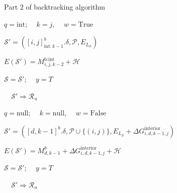 \documentclass[11pt,letterpaper]{article}  \usepackage[margin=1in]{geometry}
\theoremstyle{definition}  \newtheorem{Definition}[theorem]{Definition}
\begin{document}
\begin{algorithm}
	\caption*{Part 2 of backtracking algorithm}
	\begin{algorithmic}[1]
		\footnotesize
		
		 
		
		\State $q = \text{int}$; \ \ $k = j$, \ \ $w= \mathrm{True}$
		\EndIf	
		
		
		\State$\mathcal{S}' = ([i,j]^b_{\text{int}:k-1}.\delta, \mathcal{P}, E_{L_{\mathcal{S}}})$ 
		
		\State $E(\mathcal{S}')  = M_{i,j,k-2}^\text{b:int} + \mathcal{H}$
		
		
		
		\State $\mathcal{S} = \mathcal{S}'$; \ \  $y = T$
		
		\Else \ \  $\mathcal{S}' \Rightarrow \mathcal{R}_u$		
		
		\EndIf
		\EndIf
		\EndIf	
		
		
		\State $q = \text{null}$; \ \ $k = \text{null}$, \ \ $w= \mathrm{False}$ 
		\EndIf	
		
		
		
		
		
		\State  $\mathcal{S}' = ([d,k-1]^b.\delta, \mathcal{P} \cup \{(i,j)\}, E_{L_{\mathcal{S}}} + \Delta G_{i,d,k-1,j}^\text{interior})$
		
		\State $E(\mathcal{S}')  = M^b_{d,k-1} + \Delta G_{i,d,k-1,j}^\text{interior} + \mathcal{H}$
		
		
		
		
		\State $\mathcal{S} = \mathcal{S}'$; \ \  $y = T$
		
		\Else  \ \  $\mathcal{S}' \Rightarrow \mathcal{R}_u$		
		
		
		\EndIf
		
		
		
		\EndIf
		\EndFor
		\EndIf
		

\end{algorithmic}
\end{algorithm}
\end{document}
